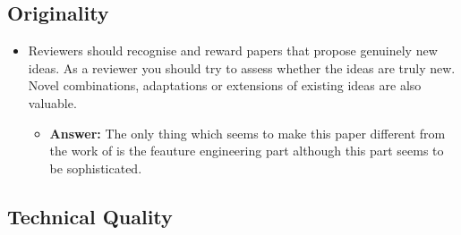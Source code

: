 \documentclass[a4paper]{article}
\begin{document}
\subsection{Originality}

\begin{itemize}
	\item Reviewers should recognise and reward papers that propose genuinely new ideas. As a reviewer you should try to assess whether the ideas are truly new. Novel combinations, adaptations or extensions of existing ideas are also valuable.
	\begin{itemize}
		\item \textbf{Answer:} The only thing which seems to make this paper different from the work of \cite{lopez2015towards} is the feauture engineering part although this part seems to be sophisticated.
	\end{itemize}
\end{itemize}


\subsection{Technical Quality}
\end{document}
